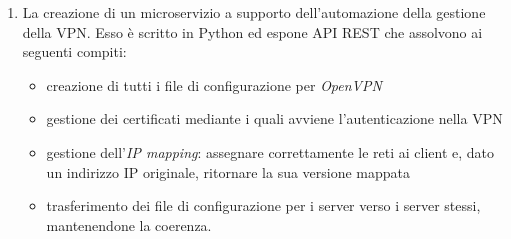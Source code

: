\documentclass[10pt,a4paper]{article}
\begin{document}
\begin{enumerate}
            \item La creazione di un microservizio a supporto dell'automazione
            della gestione della VPN. Esso è scritto in Python ed espone API REST che
            assolvono ai seguenti compiti:
            \begin{itemize}
                \item creazione di tutti i file di configurazione per \textit{OpenVPN}
                \item gestione dei certificati mediante i quali avviene l'autenticazione
                nella VPN
                \item gestione dell'\textit{IP mapping}: assegnare correttamente le reti
                ai client e, dato un indirizzo IP originale, ritornare la sua versione mappata
                \item trasferimento dei file di configurazione per i server verso i server stessi,
                mantenendone la coerenza.
            \end{itemize}
        \end{enumerate}

        
\end{document}
